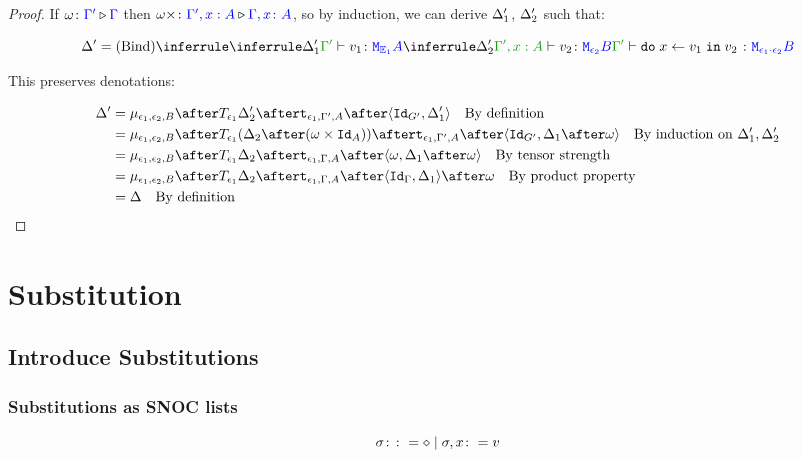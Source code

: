 \documentclass{report}
\begin{document}
\begin{framed}
\begin{proof}
        If $\omega \colon {\color{blue}\Gamma'} \triangleright {\color {blue} \Gamma}$ then $\omega\times \colon {\color{blue}\Gamma',x:A} \triangleright {\color {blue} \Gamma, x\colon A}$, so by induction, we can derive $\Delta_1'$, $\Delta_2'$ such that:
        
        \begin{equation}
            \D' = \ntreeruleII{\vbind}{
                \treeruleI{\D_1'}{\typerelation{\G'}{v_1}{\M{\E_1}{A}}}
                }{
                \treeruleI{\D_2'}{\typerelation{\G',x: A}{v_2}{\M{\e_2}{B}}}
            }{
                \typerelation{\G'}{\doin{x}{v_1}{v_2}}{\M{\e_1\dot\e_2}{B}}
            }
        \end{equation}
        
        This preserves denotations:
        
        \begin{align*}
            \D' & = \bind{\e_1}{\e_2}{B}\after\T{\e_1}{\D_2'}\after\tstrength{\e_1}{\G'}{A}\after\pr{\Id{G'}}{\D_1'}\qt{By definition}\\
            & = \bind{\e_1}{\e_2}{B}\after\T{\e_1}{(\D_2\after(\w\times\Id{A}))}\after\tstrength{\e_1}{\G'}{A}\after\pr{\Id{G'}}{\D_1\after\w}\qt{By induction on $\D_1', \D_2'$}\\
            & = \bind{\e_1}{\e_2}{B}\after\T{\e_1}{\D_2}\after\tstrength{\e_1}{\G}{A}\after\pr{\w}{\D_1\after\w}\qt{By tensor strength}\\
            & = \bind{\e_1}{\e_2}{B}\after\T{\e_1}{\D_2}\after\tstrength{\e_1}{\G}{A}\after\pr{\idg}{\D_1}\after\w\qt{By product property}\\
            & = \D \qt{By definition}
        \end{align*}
        
    \end{proof}
\end{framed}


\chapter{Substitution}
\section{Introduce Substitutions}
\subsection{Substitutions as SNOC lists}

\begin{equation}
   \sigma \colon\colon= \diamond \mid \sigma, x \colon= v
\end{equation}
\end{document}
